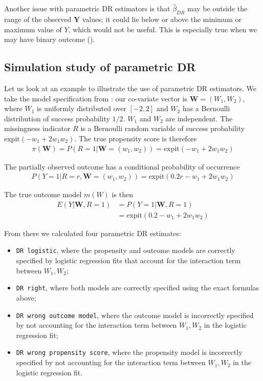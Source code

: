 \documentclass[12pt,twoside]{article}
\newcommand{\expit}{\text{expit}}
\begin{document}
Another issue with parametric DR estimators is that $\hat\beta_{DR}$ may be outside the range of the observed $\mathbf{Y}$ values; it could lie below or above the minimum or maximum value of $Y$, which would not be useful. This is especially true when we may have binary outcome (\citeauthor{vansteelandt}).

\subsection{Simulation study of parametric DR}
\label{para_model}

Let us look at an example to illustrate the use of parametric DR estimators. We take the model specification from \citet{benkeser2017}: our co-variate vector is $\mathbf{W} = (W_1, W_2)$, where $W_1$ is uniformly distributed over $[-2,2]$ and $W_2$ has a Bernoulli distribution of success probability $1/2$. $W_1$ and $W_2$ are independent. The missingness indicator $R$ is a Bernoulli random variable of success probability $\expit(-w_1 + 2w_1w_2)$. The true propensity score is therefore
\begin{align*}
    \pi(\mathbf{W}) = P(R = 1 |\mathbf{W} = (w_1,w_2)) = \expit(-w_1 + 2w_1w_2)
\end{align*}

The partially observed outcome has a conditional probability of occurrence 
\begin{align*}
    P(Y = 1|R = r,\mathbf{W} = (w_1, w_2)) = \expit(0.2r - w_1 + 2w_1w_2)
\end{align*}

The true outcome model $m(W)$ is then 
\begin{align*}
    E(Y|\mathbf{W}, R=1) &= P(Y = 1|\mathbf{W}, R= 1) \\
    & = \expit(0.2 - w_1 + 2w_1w_2)
\end{align*}

From there we calculated four parametric DR estimates: 
\begin{itemize}
    \item \texttt{DR logistic}, where the propensity and outcome models are correctly specified by logistic regression fits that account for the interaction term between $W_1, W_2$;
    \item \texttt{DR right}, where both models are correctly specified using the exact formulas above;
    \item \texttt{DR wrong outcome model}, where the outcome model is incorrectly specified by not accounting for the interaction term between $W_1, W_2$ in the logistic regression fit;
    \item \texttt{DR wrong propensity score}, where the propensity model is incorrectly specified by not accounting for the interaction term between $W_1, W_2$ in the logistic regression fit.
\end{itemize}
\end{document}
